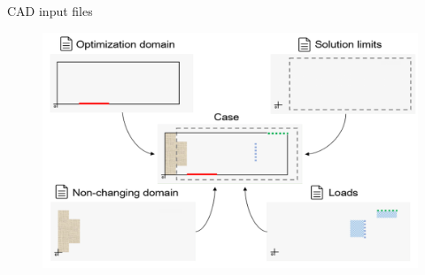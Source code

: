 \begin{frame}{CAD input files}

\begin{figure}
\centering
\includegraphics[width=.84\textwidth]{Pictures/SecondHalf/four_files.png}
\end{figure}
\end{frame}

